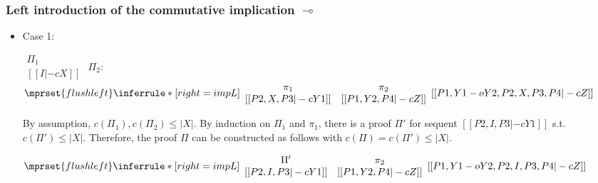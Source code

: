 \subsubsection{Left introduction of the commutative implication $\multimap$}
\begin{itemize}
\item Case 1:
      \begin{center}
        \scriptsize
        \begin{math}
          \begin{array}{c}
            \Pi_1 \\
            {[[I |-c X]]}
          \end{array}
        \end{math}
        \qquad\qquad
        $\Pi_2$:
        \begin{math}
          $$\mprset{flushleft}
          \inferrule* [right={\tiny impL}] {
            {
              \begin{array}{cc}
                \pi_1 & \pi_2 \\
                {[[P2, X, P3 |-c Y1]]} & {[[P1, Y2, P4 |-c Z]]}
              \end{array}
            }
          }{[[P1, Y1 -o Y2, P2, X, P3, P4 |-c Z]]}
        \end{math}
      \end{center}
      By assumption, $c(\Pi_1),c(\Pi_2)\leq |X|$. By induction on $\Pi_1$ and $\pi_1$, there is
      a proof $\Pi'$ for sequent $[[P2, I, P3 |-c Y1]]$ s.t. $c(\Pi') \leq |X|$. Therefore, the
      proof $\Pi$ can be constructed as follows with $c(\Pi) = c(\Pi') \leq |X|$.
      \begin{center}
        \scriptsize
        \begin{math}
          $$\mprset{flushleft}
          \inferrule* [right={\tiny impL}] {
            {
              \begin{array}{cc}
                \Pi' & \pi_2 \\
                {[[P2, I, P3 |-c Y1]]} & {[[P1, Y2, P4 |-c Z]]}
              \end{array}
            }
          }{[[P1, Y1 -o Y2, P2, I, P3, P4 |-c Z]]}
        \end{math}
      \end{center}


\end{itemize}
